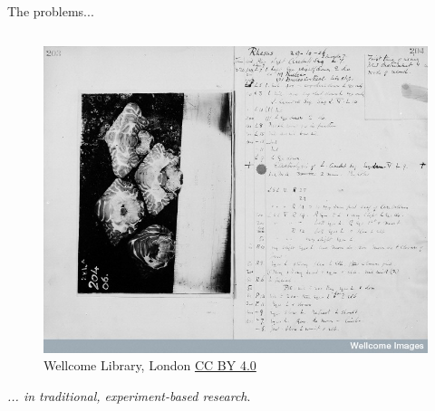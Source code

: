 \documentclass[xcolor=svgnames,11pt]{beamer}
\begin{document}
\begin{frame}{The problems...  }
\begin{columns}
\begin{column}{0.55\textwidth}
\begin{figure}
        \includegraphics{victor_horsely.jpg}
        \vspace{-0.28cm}
        \caption*{\tiny \textcopyright Wellcome Library, London 
             \href{http://creativecommons.org/licenses/by/4.0/}{CC BY
               4.0}}
      \end{figure}

      \vspace{-0.72cm}
      \begin{center}
        \textit{... in traditional, experiment-based research}.
      \end{center}
    \end{column}

  \end{columns}

\end{frame}
\end{document}
